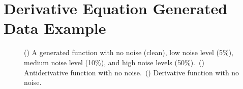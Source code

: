 \appendix
\section{Derivative Equation Generated Data Example}
\begin{figure}[H]
  \centering
  \begin{subfigure}{\linewidth}
    \begin{adjustbox}{width=\linewidth}
      
    \end{adjustbox}
    \caption{}\label{fig:antiderivative_noise_levels}
  \end{subfigure}
  \begin{subfigure}{\linewidth}
    \begin{adjustbox}{width=\linewidth}
      
    \end{adjustbox}
    \caption{}\label{fig:antiderivative}
  \end{subfigure}
  \begin{subfigure}{\linewidth}
    \begin{adjustbox}{width=\linewidth}
      
    \end{adjustbox}
    \caption{}\label{fig:derivative}
  \end{subfigure}
  \caption{() A generated function with no noise (clean), low noise level (5\%), medium noise level (10\%), and high noise levels (50\%).\ () Antiderivative function with no noise.\ () Derivative function with no noise.}
\end{figure}

